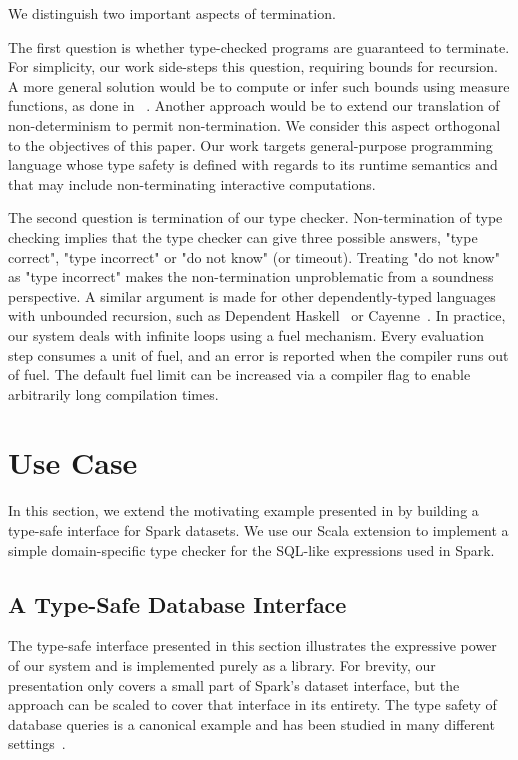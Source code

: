 We distinguish two important aspects of termination.

The first question is whether type-checked programs are guaranteed to terminate.
For simplicity, our work side-steps this question, requiring bounds for recursion.
A more general solution would be to compute or infer such bounds using measure functions, as done in \FR~\citep{hamza2019system}.
Another approach would be to extend our translation of non-determinism to permit non-termination.
We consider this aspect orthogonal to the objectives of this paper.
Our work targets general-purpose programming language whose type safety is defined with regards to its runtime semantics and that may include non-terminating interactive computations.

The second question is termination of our type checker.
Non-termination of type checking implies that the type checker can give three possible answers, "type correct", "type incorrect" or "do not know" (or timeout).
Treating "do not know" as "type incorrect" makes the non-termination unproblematic from a soundness perspective.
A similar argument is made for other dependently-typed languages with unbounded recursion, such as Dependent Haskell~\citep{eisenberg2016dependent} or Cayenne~\citep{augustsson1998cayenne}.
In practice, our system deals with infinite loops using a fuel mechanism.
Every evaluation step consumes a unit of fuel, and an error is reported when the compiler runs out of fuel.
The default fuel limit can be increased via a compiler flag to enable arbitrarily long compilation times.

\section{Use Case}
\label{sec:use-case}

In this section, we extend the motivating example presented in  by building a type-safe interface for Spark datasets.
We use our Scala extension to implement a simple domain-specific type checker for the SQL-like expressions used in Spark.

\subsection{A Type-Safe Database Interface}

The type-safe interface presented in this section illustrates the expressive power of our system and is implemented purely as a library.
For brevity, our presentation only covers a small part of Spark's dataset interface, but the approach can be scaled to cover that interface in its entirety.
The type safety of database queries is a canonical example and has been studied in many different settings~\citep{leijen1999domain, kazerounian2019type, meijer2006linq, chlipala2010ur}.

